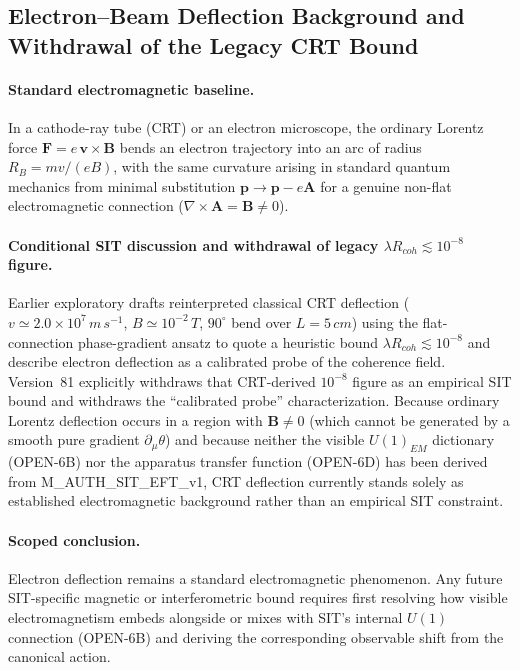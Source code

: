 \documentclass[american,11pt,letterpaper]{article}
\def\mathrm#1{#1}%
\def\texttt#1{#1}%
\def\emph#1{#1}%
\begin{document}
\subsection{Electron--Beam Deflection Background and Withdrawal of the Legacy CRT Bound}
\label{sec:magnet}

\paragraph{Standard electromagnetic baseline.}
In a cathode-ray tube (CRT) or an electron microscope, the ordinary Lorentz force
$\boldsymbol{F}=e\,\boldsymbol{v}\!\times\!\boldsymbol{B}$ bends an electron
trajectory into an arc of radius
$R_{\!B}=mv/(eB)$, with the same curvature arising in standard quantum mechanics from minimal substitution
$\boldsymbol{p}\to\boldsymbol{p}-e\boldsymbol{A}$ for a genuine non-flat electromagnetic connection ($\nabla\times\boldsymbol{A} = \boldsymbol{B} \ne 0$).

\paragraph{Conditional SIT discussion and withdrawal of legacy $\lambda R_{\mathrm{coh}} \lesssim 10^{-8}$ figure.}
Earlier exploratory drafts reinterpreted classical CRT deflection ($v \simeq 2.0\times 10^{7}\,\mathrm{m\,s^{-1}}$, $B \simeq 10^{-2}\,\mathrm{T}$, $90^\circ$ bend over $L = 5\,\mathrm{cm}$) using the flat-connection phase-gradient ansatz to quote a heuristic bound $\lambda R_{\mathrm{coh}} \lesssim 10^{-8}$ and describe electron deflection as a calibrated probe of the coherence field. Version~81 explicitly \emph{withdraws} that CRT-derived $10^{-8}$ figure as an empirical SIT bound and withdraws the ``calibrated probe'' characterization. Because ordinary Lorentz deflection occurs in a region with $\boldsymbol{B} \ne 0$ (which cannot be generated by a smooth pure gradient $\partial_\mu\theta$) and because neither the visible $U(1)_{\mathrm{EM}}$ dictionary (\texttt{OPEN-6B}) nor the apparatus transfer function (\texttt{OPEN-6D}) has been derived from \texttt{M\_AUTH\_SIT\_EFT\_v1}, CRT deflection currently stands solely as established electromagnetic background rather than an empirical SIT constraint.

\paragraph{Scoped conclusion.}
Electron deflection remains a standard electromagnetic phenomenon. Any future SIT-specific magnetic or interferometric bound requires first resolving how visible electromagnetism embeds alongside or mixes with SIT's internal $U(1)$ connection (\texttt{OPEN-6B}) and deriving the corresponding observable shift from the canonical action.
\end{document}
